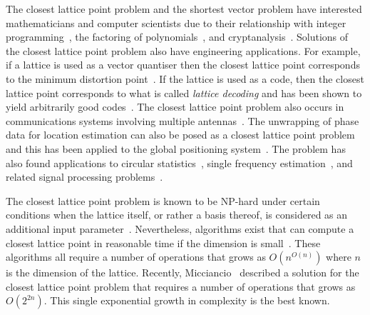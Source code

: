 \documentclass[final,leqno]{siamltex}
\begin{document}
The closest lattice point problem and the shortest vector problem have interested mathematicians and computer scientists due to their relationship with integer programming~\cite{Lenstra_integerprogramming1983,Kannan1987_fast_general_np,Babai1986}, the factoring of polynomials~\cite{Lenstra1982}, and cryptanalysis~\cite{Joux_toolbox_cryptanal1998,NyguyenStern_two_faces_crypto,Micciancio_lattice_based_post_quantum_crypto}.  
Solutions of the closest lattice point problem also have engineering applications.  For example, if a lattice is used as a vector quantiser then the closest lattice point corresponds to the minimum distortion point~\cite{Conway1983VoronoiCodes,Conway1982VoronoiRegions,Conway1982FastQuantDec}.  If the lattice is used as a code, then the closest lattice point corresponds to what is called \emph{lattice decoding} and has been shown to yield arbitrarily good codes~\cite{Erex2004_lattice_decoding,Erez2005}.  The closest lattice point problem also occurs in communications systems involving multiple antennas~\cite{Ryan2008,Wubben_2011}.  The unwrapping of phase data for location estimation can also be posed as a closest lattice point problem and this has been applied to the global positioning system~\cite{Teunissen_GPS_1995,Hassibi_GPS_1998}.  The problem has also found applications to circular statistics~\cite{McKilliam_mean_dir_est_sq_arc_length2010}, single frequency estimation~\cite{McKilliamFrequencyEstimationByPhaseUnwrapping2009}, and related signal processing problems~\cite{McKilliam2007,Clarkson2007,McKilliam2009IndentifiabliltyAliasingPolyphase,Quinn_sparse_noisy_SSP_2012}.

The closest lattice point problem is known to be NP-hard under certain conditions when the lattice itself, or rather a basis thereof, is considered as an additional input parameter~\cite{micciancio_hardness_2001, Dinur2003_approximating_CVP_NP_hard, Jalden2005_sphere_decoding_complexity}. Nevertheless, algorithms exist that can compute a closest lattice point in reasonable time if the dimension is small~\cite{Pohst_sphere_decoder_1981,Kannan1987_fast_general_np,Agrell2002}.  These algorithms all require a number of operations that grows as $O(n^{O(n)})$ where $n$ is the dimension of the lattice.  Recently, Micciancio~\cite{Micciancio09adeterministic} described a solution for the closest lattice point problem that requires a number of operations that grows as $O(2^{2n})$.  This single exponential growth in complexity is the best known. 
\end{document}
